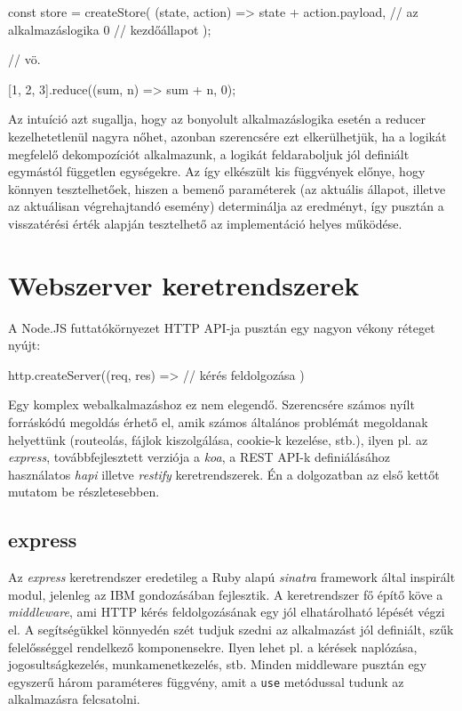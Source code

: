 \begin{js}
const store = createStore(
  (state, action) => state + action.payload, // az alkalmazáslogika
  0                                          // kezdőállapot
);

// vö.

[1, 2, 3].reduce((sum, n) => sum + n, 0);
\end{js}

Az intuíció azt sugallja, hogy az bonyolult alkalmazáslogika esetén a reducer
kezelhetetlenül nagyra nőhet, azonban szerencsére ezt elkerülhetjük, ha a
logikát megfelelő dekompozíciót alkalmazunk, a logikát feldaraboljuk jól
definiált egymástól független egységekre. Az így elkészült kis függvények
előnye, hogy könnyen tesztelhetőek, hiszen a bemenő paraméterek (az aktuális
állapot, illetve az aktuálisan végrehajtandó esemény) determinálja az eredményt,
így pusztán a visszatérési érték alapján tesztelhető az implementáció helyes
működése.

\section{Webszerver keretrendszerek}

A Node.JS futtatókörnyezet HTTP API-ja pusztán egy nagyon vékony réteget nyújt:

\begin{js}
http.createServer((req, res) => {
  // kérés feldolgozása
})
\end{js}

Egy komplex webalkalmazáshoz ez nem elegendő.  Szerencsére számos nyílt
forráskódú megoldás érhető el, amik számos általános problémát megoldanak
helyettünk (routeolás, fájlok kiszolgálása, cookie-k kezelése, stb.), ilyen pl.
az \emph{express}\cite{express}, továbbfejlesztett verziója a
\emph{koa}\cite{koa}, a REST API-k definiálásához használatos
\emph{hapi}\cite{hapi} illetve \emph{restify}\cite{restify} keretrendszerek.  Én
a dolgozatban az első kettőt mutatom be részletesebben.

\subsection{express}

Az \emph{express} keretrendszer eredetileg a Ruby alapú
\emph{sinatra}\cite{sinatra} framework által inspirált modul, jelenleg az IBM
gondozásában fejlesztik.  A keretrendszer fő építő köve a \emph{middleware}, ami
HTTP kérés feldolgozásának egy jól elhatárolható lépését végzi el.  A
segítségükkel könnyedén szét tudjuk szedni az alkalmazást jól definiált, szűk
felelősséggel rendelkező komponensekre. Ilyen lehet pl. a kérések naplózása,
jogosultságkezelés, munkamenetkezelés, stb.  Minden middleware pusztán egy
egyszerű három paraméteres függvény, amit a \texttt{use} metódussal tudunk az
alkalmazásra felcsatolni.

